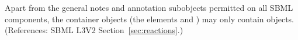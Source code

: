 Apart from the general notes and annotation subobjects permitted on all
SBML components, the \ListOfSpeciesReferences container objects (\ie the
\Reaction elements  and ) may
only contain \SpeciesReference objects.  (References: SBML L3V2
Section~\ref{sec:reactions}.)
